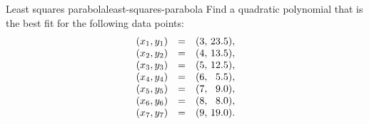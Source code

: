 \documentclass{ximera}
\begin{document}
\begin{example}{Least squares parabola}{least-squares-parabola}
  Find a quadratic polynomial that is the best fit for the following
  data points:
  \begin{equation*}
    \begin{array}{rcr@{~}r}
      (x_1,y_1) &=& ( 3,& 23.5), \\
      (x_2,y_2) &=& ( 4,& 13.5), \\
      (x_3,y_3) &=& ( 5,& 12.5), \\
      (x_4,y_4) &=& ( 6,&  5.5), \\
      (x_5,y_5) &=& ( 7,&  9.0), \\
      (x_6,y_6) &=& ( 8,&  8.0), \\
      (x_7,y_7) &=& ( 9,& 19.0). \\
    \end{array}
  \end{equation*}
\end{example}
\end{document}
